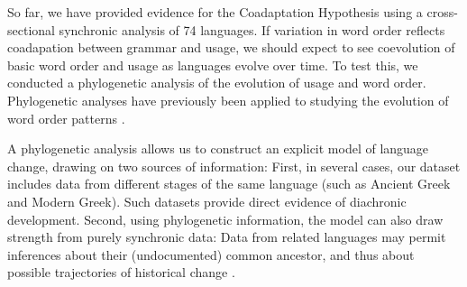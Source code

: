 \documentclass[11pt,a4paper]{article}
\begin{document}



So far, we have provided evidence for the Coadaptation Hypothesis using a cross-sectional synchronic analysis of 74 languages.
If variation in word order reflects coadapation between grammar and usage, we should expect to see coevolution of basic word order and usage as languages evolve over time.
To test this, we conducted a phylogenetic analysis of the evolution of usage and word order.
Phylogenetic analyses have previously been applied to studying the evolution of word order patterns \citep{dunn-evolved-2011, maurits2014tracing}.

A phylogenetic analysis allows us to construct an explicit model of language change, drawing on two sources of information:
First, in several cases, our dataset includes data from different stages of the same language (such as Ancient Greek and Modern Greek).
Such datasets provide direct evidence of diachronic development.
Second, using phylogenetic information, the model can also draw strength from purely synchronic data:
Data from related languages may permit inferences about their (undocumented) common ancestor, and thus about possible trajectories of historical change \citep{pagel2004bayesian, dunn-evolved-2011, maurits2014tracing}.
\end{document}
